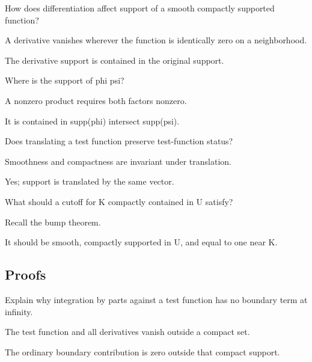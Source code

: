 \begin{exercise}\label{exr:iii15-expand-02}
How does differentiation affect support of a smooth compactly supported function?
\end{exercise}
\begin{hint}
A derivative vanishes wherever the function is identically zero on a neighborhood.
\end{hint}
\begin{solution}
The derivative support is contained in the original support.
\end{solution}

\begin{exercise}\label{exr:iii15-expand-03}
Where is the support of phi psi?
\end{exercise}
\begin{hint}
A nonzero product requires both factors nonzero.
\end{hint}
\begin{solution}
It is contained in supp(phi) intersect supp(psi).
\end{solution}

\begin{exercise}[Translation]\label{exr:iii15-expand-04}
Does translating a test function preserve test-function status?
\end{exercise}
\begin{hint}
Smoothness and compactness are invariant under translation.
\end{hint}
\begin{solution}
Yes; support is translated by the same vector.
\end{solution}

\begin{exercise}\label{exr:iii15-expand-05}
What should a cutoff for K compactly contained in U satisfy?
\end{exercise}
\begin{hint}
Recall the bump theorem.
\end{hint}
\begin{solution}
It should be smooth, compactly supported in U, and equal to one near K.
\end{solution}

\subsection*{Proofs}

\begin{exercise}\label{exr:iii15-expand-06}
Explain why integration by parts against a test function has no boundary term at infinity.
\end{exercise}
\begin{hint}
The test function and all derivatives vanish outside a compact set.
\end{hint}
\begin{solution}
The ordinary boundary contribution is zero outside that compact support.
\end{solution}

